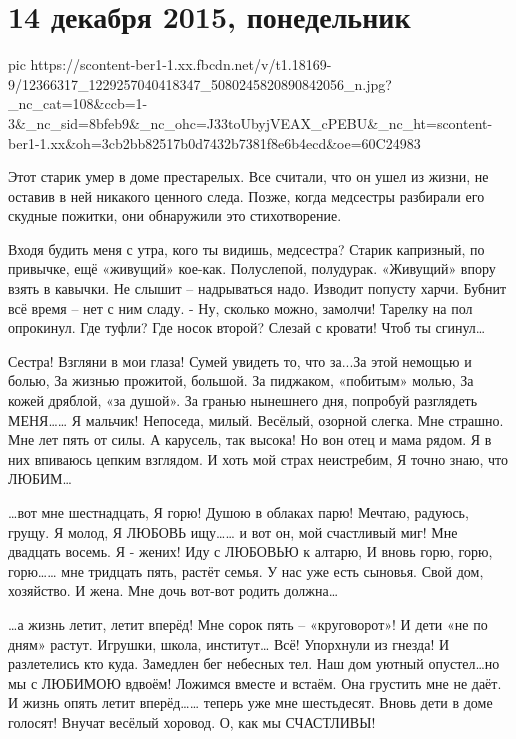  
 
 
 
 
\section{14 декабря 2015, понедельник}
\label{sec:14_12_2015}

\ifcmt
  pic https://scontent-ber1-1.xx.fbcdn.net/v/t1.18169-9/12366317_1229257040418347_5080245820890842056_n.jpg?_nc_cat=108&ccb=1-3&_nc_sid=8bfeb9&_nc_ohc=J33toUbyjVEAX_cPEBU&_nc_ht=scontent-ber1-1.xx&oh=3cb2bb82517b0d7432b7381f8e6b4ecd&oe=60C24983
\fi

Этот старик умер в доме престарелых. Все считали, что он ушел из жизни, не
оставив в ней никакого ценного следа. Позже, когда медсестры разбирали его
скудные пожитки, они обнаружили это стихотворение.

Входя будить меня с утра, кого ты видишь, медсестра? Старик капризный, по
привычке, ещё «живущий» кое-как. Полуслепой, полудурак. «Живущий» впору взять в
кавычки. Не слышит – надрываться надо. Изводит попусту харчи. Бубнит всё время
– нет с ним сладу. - Ну, сколько можно, замолчи! Тарелку на пол опрокинул. Где
туфли? Где носок второй? Слезай с кровати! Чтоб ты сгинул…

Сестра! Взгляни в мои глаза! Сумей увидеть то, что за...За этой немощью и
болью, За жизнью прожитой, большой. За пиджаком, «побитым» молью, За кожей
дряблой, «за душой». За гранью нынешнего дня, попробуй разглядеть МЕНЯ…… Я
мальчик! Непоседа, милый. Весёлый, озорной слегка. Мне страшно. Мне лет пять от
силы. А карусель, так высока! Но вон отец и мама рядом. Я в них впиваюсь цепким
взглядом. И хоть мой страх неистребим, Я точно знаю, что ЛЮБИМ…

…вот мне шестнадцать, Я горю! Душою в облаках парю! Мечтаю, радуюсь, грущу. Я
молод, Я ЛЮБОВЬ ищу…… и вот он, мой счастливый миг! Мне двадцать восемь. Я -
жених! Иду с ЛЮБОВЬЮ к алтарю, И вновь горю, горю, горю…… мне тридцать пять,
растёт семья. У нас уже есть сыновья. Свой дом, хозяйство. И жена. Мне дочь
вот-вот родить должна…

…а жизнь летит, летит вперёд! Мне сорок пять – «круговорот»! И дети «не по
дням» растут. Игрушки, школа, институт… Всё! Упорхнули из гнезда! И разлетелись
кто куда. Замедлен бег небесных тел. Наш дом уютный опустел…но мы с ЛЮБИМОЮ
вдвоём! Ложимся вместе и встаём. Она грустить мне не даёт. И жизнь опять летит
вперёд…… теперь уже мне шестьдесят. Вновь дети в доме голосят! Внучат весёлый
хоровод. О, как мы СЧАСТЛИВЫ!

